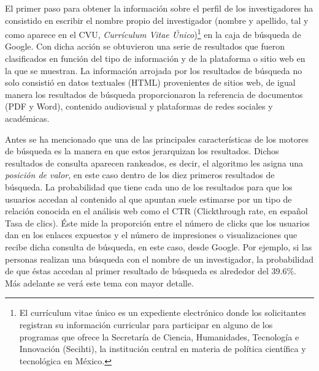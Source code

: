 \documentclass[
  spanish,
  11pt,
  a4paper,
]{scrbook}
\begin{document}
El primer paso para obtener la información sobre el perfil de los
investigadores ha consistido en escribir el nombre propio del
investigador (nombre y apellido, tal y como aparece en el CVU,
\emph{Currículum Vitae Único})\footnote{El currículum vitae único es un
  expediente electrónico donde los solicitantes registran su información
  curricular para participar en alguno de los programas que ofrece la
  Secretaría de Ciencia, Humanidades, Tecnología e Innovación (Secihti),
  la institución central en materia de política científica y tecnológica
  en México.} en la caja de búsqueda de Google. Con dicha acción se
obtuvieron una serie de resultados que fueron clasificados en función
del tipo de información y de la plataforma o sitio web en la que se
muestran. La información arrojada por los resultados de búsqueda no solo
consistió en datos textuales (HTML) provenientes de sitios web, de igual
manera los resultados de búsqueda proporcionaron la referencia de
documentos (PDF y Word), contenido audiovisual y plataformas de redes
sociales y académicas.

Antes se ha mencionado que una de las principales características de los
motores de búsqueda es la manera en que estos jerarquizan los
resultados. Dichos resultados de consulta aparecen rankeados, es decir,
el algoritmo les asigna una \emph{posición de valor}, en este caso
dentro de los diez primeros resultados de búsqueda. La probabilidad que
tiene cada uno de los resultados para que los usuarios accedan al
contenido al que apuntan suele estimarse por un tipo de relación
conocida en el análisis web como el CTR (Clickthrough rate, en español
Tasa de clics). Éste mide la proporción entre el número de clicks que
los usuarios dan en los enlaces expuestos y el número de impresiones o
visualizaciones que recibe dicha consulta de búsqueda, en este caso,
desde Google. Por ejemplo, si las personas realizan una búsqueda con el
nombre de un investigador, la probabilidad de que éstas accedan al
primer resultado de búsqueda es alrededor del 39.6\%. Más adelante se
verá este tema con mayor detalle.
\end{document}
